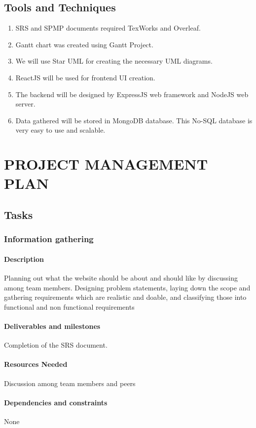 \documentclass[12pt, letterpaper, twoside]{report}
\begin{document}
\section{Tools and Techniques}
\begin{enumerate}
\item SRS and SPMP documents required TexWorks and Overleaf.
\item Gantt chart was created using Gantt Project.
\item We will use Star UML for creating the necessary UML diagrams.
\item ReactJS will be used for frontend UI creation.
\item The backend will be designed by ExpressJS web framework and NodeJS web server.
\item Data gathered will be stored in MongoDB database. This No-SQL database is very easy to use and scalable.
\end{enumerate}
\chapter{PROJECT MANAGEMENT PLAN}
\section{Tasks}
\subsection{Information gathering}
\subsubsection{Description}
Planning out what the website should be about and should like by discussing among team members. Designing problem statements, laying down the scope and gathering requirements which are realistic and doable, and classifying those into functional and non functional requirements
\subsubsection{Deliverables and milestones}
Completion of the SRS document.
\subsubsection{Resources Needed}
Discussion among team members and peers
\subsubsection{Dependencies and constraints}
None
\end{document}
